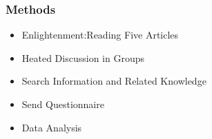 \begin{frame}
    \frametitle{Methods}
    \Large
    \begin{itemize}[<+->]
        \item Enlightenment:Reading Five Articles
        \item Heated Discussion in Groups
        \item Search Information and Related Knowledge
        \item Send Questionnaire
        \item Data Analysis
    \end{itemize}
\end{frame}